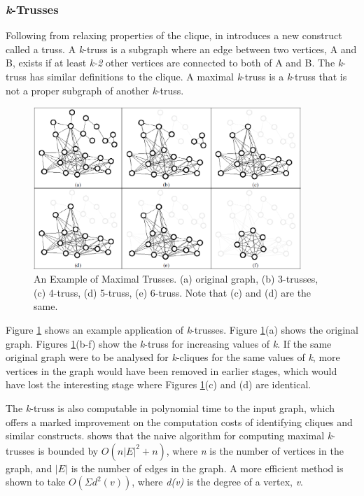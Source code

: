 \subsubsection{\emph{k}-Trusses}
Following from relaxing properties of the clique, \citeauthor{trusses} in \cite{trusses} introduces a new construct called a truss. A \emph{k}-truss is a subgraph where an edge between two vertices, A and B, exists if at least \emph{k-2} other vertices are connected to both of A and B. The \emph{k}-truss has similar definitions to the clique. A maximal \emph{k}-truss is a \emph{k}-truss that is not a proper subgraph of another \emph{k}-truss.

\begin{figure}[htbp]
\centering
\includegraphics[width=0.9\textwidth]{./img/trusses.png}
\caption{An Example of Maximal Trusses. (a) original graph, (b) 3-trusses, (c) 4-truss, (d) 5-truss, (e) 6-truss. Note that (c) and (d) are the same. \cite{trusses}}
\label{fig:trusses}
\end{figure}

Figure \ref{fig:trusses} shows an example application of \emph{k}-trusses. Figure \ref{fig:trusses}(a) shows the original graph. Figures \ref{fig:trusses}(b-f) show the \emph{k}-truss for increasing values of \emph{k}. If the same original graph were to be analysed for \emph{k}-cliques for the same values of \emph{k}, more vertices in the graph would have been removed in earlier stages, which would have lost the interesting stage where Figures \ref{fig:trusses}(c) and (d) are identical.

The \emph{k}-truss is also computable in polynomial time to the input graph, which offers a marked improvement on the computation costs of identifying cliques and similar constructs. \cite{trusses} shows that the naive algorithm  for computing maximal \emph{k}-trusses is bounded by $O(n|E|^2 + n)$, where \emph{n} is the number of vertices in the graph, and $|E|$ is the number of edges in the graph. A more efficient method is shown to take $O(\Sigma d^2(v))$, where \emph{d(v)} is the degree of a vertex, \emph{v}.
